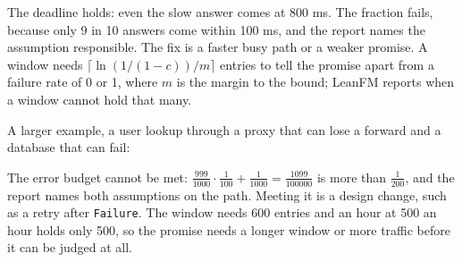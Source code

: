 

The deadline holds: even the slow answer comes at 800 ms. The fraction fails,
because only 9 in 10 answers come within 100 ms, and the report names the
assumption responsible. The fix is a faster busy path or a weaker promise. A
window needs $\lceil \ln(1/(1-c))/m \rceil$ entries to tell the promise apart
from a failure rate of 0 or 1, where $m$ is the margin to the bound; LeanFM
reports when a window cannot hold that many.

A larger example, a user lookup through a proxy that can lose a forward and a
database that can fail:





The error budget cannot be met: $\frac{999}{1000}\cdot\frac{1}{100} +
\frac{1}{1000} = \frac{1099}{100000}$ is more than $\frac{1}{200}$, and the report
names both assumptions on the path. Meeting it is a design change, such as a
retry after \texttt{Failure}. The window needs 600 entries and an hour at 500 an
hour holds only 500, so the promise needs a longer window or more traffic before
it can be judged at all.
